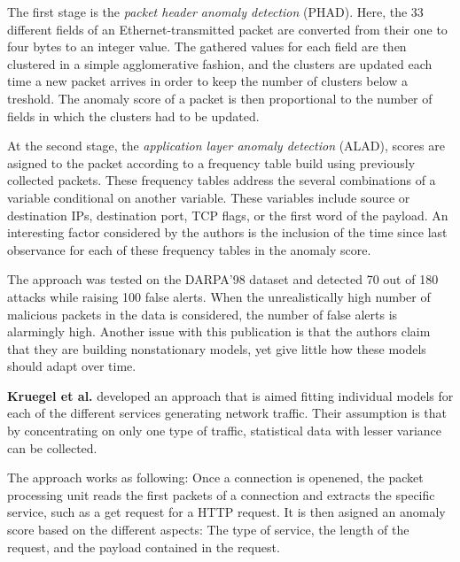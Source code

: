 \documentclass[a4paper,12pt,twoside]{report}
\begin{document}
The first stage is the \textit{packet header anomaly detection} (PHAD). Here, the 33 different fields of an Ethernet-transmitted packet are converted from their one to four bytes to an integer value. The gathered values for each field are then clustered in a simple agglomerative fashion, and the clusters are updated each time a new packet arrives in order to keep the number of clusters below a treshold. The anomaly score of a packet is then proportional to the number of fields in which the clusters had to be updated. 

At the second stage, the \textit{application layer anomaly detection} (ALAD), scores are asigned to the packet according to a frequency table build using previously collected packets. These frequency tables address the several combinations of a variable conditional on another variable. These variables include source or destination IPs, destination port, TCP flags, or the first word of the payload. An interesting factor considered by the authors is the inclusion of the time since last observance for each of these frequency tables in the anomaly score.

The approach was tested on the DARPA'98 dataset and detected 70 out of 180 attacks while raising 100 false alerts. When the unrealistically high number of malicious packets in the data is considered, the number of false alerts is alarmingly high. Another issue with this publication is that the authors claim that they are building nonstationary models, yet give little how these models should adapt over time. 


\textbf{Kruegel et al.} \cite{krugel2002service} developed an approach that is aimed fitting individual models for each of the different services generating network traffic. Their assumption is that by concentrating on only one type of traffic, statistical data with lesser variance can be collected. 

The approach works as following: Once a connection is openened, the packet processing unit reads the first packets of a connection and extracts the specific service, such as a get request for a HTTP request. It is then asigned an anomaly score based on the different aspects: The type of service, the length of the request, and the payload contained in the request. 
\end{document}
